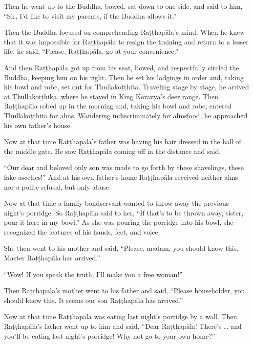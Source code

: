 \documentclass[12pt,openany]{book}%
\begin{document}
Then he went up to the Buddha, bowed, sat down to one side, and said to him, “Sir, I’d like to visit my parents, if the Buddha allows it.” 

Then the Buddha focused on comprehending \textsanskrit{Raṭṭhapāla}’s mind. When he knew that it was impossible for \textsanskrit{Raṭṭhapāla} to resign the training and return to a lesser life, he said, “Please, \textsanskrit{Raṭṭhapāla}, go at your convenience.” 

And then \textsanskrit{Raṭṭhapāla} got up from his seat, bowed, and respectfully circled the Buddha, keeping him on his right. Then he set his lodgings in order and, taking his bowl and robe, set out for \textsanskrit{Thullakoṭṭhita}. Traveling stage by stage, he arrived at \textsanskrit{Thullakoṭṭhika}, where he stayed in King Koravya’s deer range. Then \textsanskrit{Raṭṭhapāla} robed up in the morning and, taking his bowl and robe, entered \textsanskrit{Thullakoṭṭhita} for alms. Wandering indiscriminately for almsfood, he approached his own father’s house. 

Now at that time \textsanskrit{Raṭṭhapāla}’s father was having his hair dressed in the hall of the middle gate. He saw \textsanskrit{Raṭṭhapāla} coming off in the distance and said, 

“Our dear and beloved only son was made to go forth by these shavelings, these fake ascetics!” And at his own father’s home \textsanskrit{Raṭṭhapāla} received neither alms nor a polite refusal, but only abuse. 

Now at that time a family bondservant wanted to throw away the previous night’s porridge. So \textsanskrit{Raṭṭhapāla} said to her, “If that’s to be thrown away, sister, pour it here in my bowl.” As she was pouring the porridge into his bowl, she recognized the features of his hands, feet, and voice. 

She then went to his mother and said, “Please, madam, you should know this. Master \textsanskrit{Raṭṭhapāla} has arrived.” 

“Wow! If you speak the truth, I’ll make you a free woman!” 

Then \textsanskrit{Raṭṭhapāla}’s mother went to his father and said, “Please householder, you should know this. It seems our son \textsanskrit{Raṭṭhapāla} has arrived.” 

Now at that time \textsanskrit{Raṭṭhapāla} was eating last night’s porridge by a wall. Then \textsanskrit{Raṭṭhapāla}’s father went up to him and said, “Dear \textsanskrit{Raṭṭhapāla}! There’s … and you’ll be eating last night’s porridge! Why not go to your own home?” 
\end{document}
